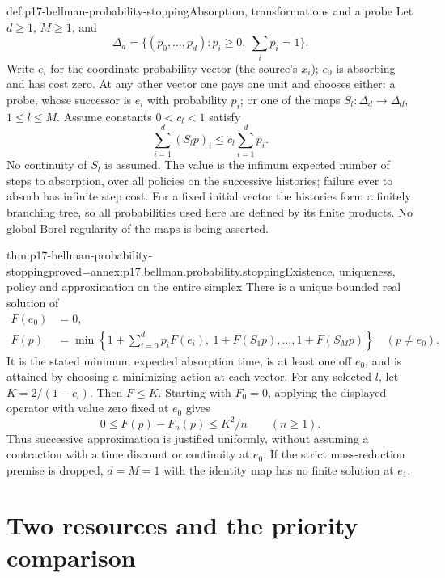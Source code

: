 \begin{hbdefinition}{def:p17-bellman-probability-stopping}{Absorption, transformations and a probe}
Let \(d\geq1\), \(M\geq1\), and
\[
 \Delta_d=\{(p_0,\ldots,p_d):p_i\geq0,\ \textstyle\sum_i p_i=1\}.
\]
Write \(e_i\) for the coordinate probability vector
(the source's \(x_i\)); \(e_0\) is absorbing and has cost zero.
At any other vector one pays one unit and chooses either:
a probe, whose successor is \(e_i\) with probability \(p_i\);
or one of the maps \(S_l:\Delta_d\to\Delta_d\), \(1\leq l\leq M\).
Assume constants \(0<c_l<1\) satisfy
\[
              \sum_{i=1}^d(S_lp)_i
                            \leq c_l\sum_{i=1}^d p_i.
\]
No continuity of \(S_l\) is assumed.
The value is the infimum expected number of steps to absorption,
over all policies on the successive histories; failure ever to
absorb has infinite step cost.
For a fixed initial vector the histories form a finitely branching
tree, so all probabilities used here are defined by its finite
products. No global Borel regularity of the maps is being asserted.
\end{hbdefinition}

\begin{hbtheorem}{thm:p17-bellman-probability-stopping}{proved=annex:p17.bellman.probability.stopping}{Existence, uniqueness, policy and approximation on the entire simplex}
There is a unique bounded real solution of
\[
 \begin{split}
 F(e_0)&=0,\\
 F(p)&=\min\left\{1+\sum_{i=0}^d p_iF(e_i),\
                          1+F(S_1p),\ldots,1+F(S_Mp)\right\}
                                                     \quad(p\ne e_0).
 \end{split}
\]
It is the stated minimum expected absorption time, is at least
one off \(e_0\), and is attained by choosing a minimizing
action at each vector.
For any selected \(l\), let \(K=2/(1-c_l)\). Then \(F\leq K\).
Starting with \(F_0=0\), applying the displayed operator
with value zero fixed at \(e_0\) gives
\[
                0\leq F(p)-F_n(p)\leq K^2/n\qquad(n\geq1).
\]
Thus successive approximation is justified uniformly, without
assuming a contraction with a time discount or continuity at \(e_0\).
If the strict mass-reduction premise is dropped, \(d=M=1\)
with the identity map has no finite solution at \(e_1\).
\end{hbtheorem}

\section{Two resources and the priority comparison}

